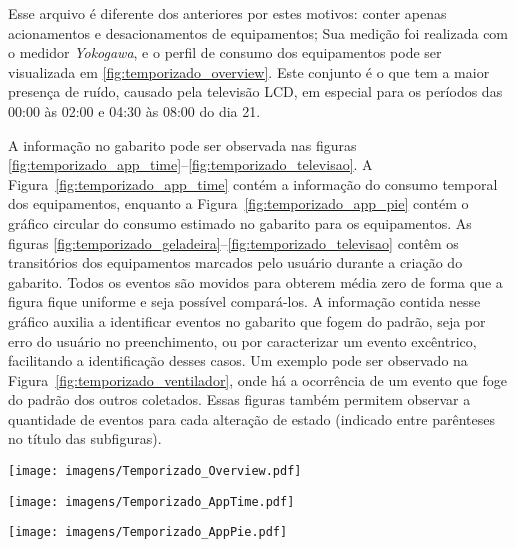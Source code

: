 Esse arquivo é diferente dos anteriores por estes motivos: 
conter apenas acionamentos e desacionamentos de equipamentos; 
Sua medição foi realizada com o medidor \emph{Yokogawa}, e o perfil de
consumo dos equipamentos pode ser visualizada em
\ref{fig:temporizado_overview}. Este conjunto é o que tem a maior
presença de ruído, causado pela televisão LCD, em especial para os
períodos das 00:00 às 02:00 e 04:30 às 08:00 do dia 21.

A informação no gabarito pode ser observada nas figuras
\ref{fig:temporizado_app_time}--\ref{fig:temporizado_televisao}.  A
Figura~\ref{fig:temporizado_app_time} contém a informação do consumo
temporal dos equipamentos, enquanto a
Figura~\ref{fig:temporizado_app_pie} contém o gráfico circular do
consumo estimado no gabarito para os equipamentos. As figuras
\ref{fig:temporizado_geladeira}--\ref{fig:temporizado_televisao}
contêm os transitórios dos equipamentos marcados pelo usuário durante a
criação do gabarito. Todos os eventos são movidos para obterem média
zero de forma que a figura fique uniforme e seja possível compará-los.
A informação contida nesse gráfico auxilia a identificar eventos no
gabarito que fogem do padrão, seja por erro do usuário no
preenchimento, ou por caracterizar um evento excêntrico, facilitando a
identificação desses casos. Um exemplo pode ser observado na
Figura~\ref{fig:temporizado_ventilador}, onde há a ocorrência de um
evento que foge do padrão dos outros coletados. Essas figuras também
permitem observar a quantidade de eventos para cada alteração de
estado (indicado entre parênteses no título das subfiguras).

\begin{sidewaysfigure}[p]
\centering
\texttt{[image: imagens/Temporizado\_Overview.pdf]}
\caption{Perfil de consumo para o conjunto de dados \emph{Temporizado}.}
\label{fig:temporizado_overview}
\end{sidewaysfigure}

\begin{sidewaysfigure}[p]
\centering
\texttt{[image: imagens/Temporizado\_AppTime.pdf]}
\caption{Informação no gabarito para o conjunto de dados
\emph{Temporizado}: consumo temporal dos equipamentos.}
\label{fig:temporizado_app_time}
\end{sidewaysfigure}

\begin{sidewaysfigure}[p]
\centering
\texttt{[image: imagens/Temporizado\_AppPie.pdf]}
\caption{Informação no gabarito para o conjunto de dados
\emph{Temporizado}: gráfico circular do consumo dos equipamentos.}
\label{fig:temporizado_app_pie}
\end{sidewaysfigure}

